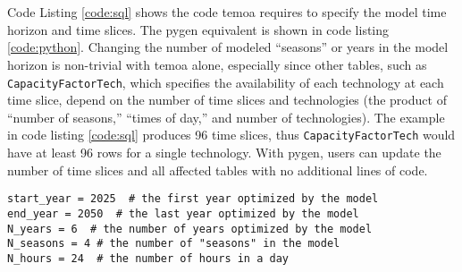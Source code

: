 


\renewcommand{\thesection}{\Alph{section}}
\section{}

\label{app:pygen}
Code Listing \ref{code:sql} shows
the code \gls{temoa} requires to specify the model time horizon and time slices.
The \gls{pygen} equivalent is shown in code listing \ref{code:python}. Changing
the number of modeled ``seasons'' or years in the model horizon is non-trivial with
\gls{temoa} alone, especially since other tables, such as \texttt{CapacityFactorTech},
which specifies the availability of each technology at each time slice, depend
on the number of time slices and technologies (the product of ``number of seasons,''
``times of day,'' and number of technologies).
The example in code listing \ref{code:sql} produces 96 time slices, thus \texttt{CapacityFactorTech}
would have at least 96 rows for a single technology. With \gls{pygen}, users can
update the number of time slices and all affected tables with no additional lines
of code.




\begin{lstlisting}[style=pythonstyle, caption={Equivalent \gls{pygen} code to specify the model horizon and time slices.}, label={code:python}, floatplacement=H]
start_year = 2025  # the first year optimized by the model
end_year = 2050  # the last year optimized by the model
N_years = 6  # the number of years optimized by the model
N_seasons = 4 # the number of "seasons" in the model
N_hours = 24  # the number of hours in a day
\end{lstlisting}

